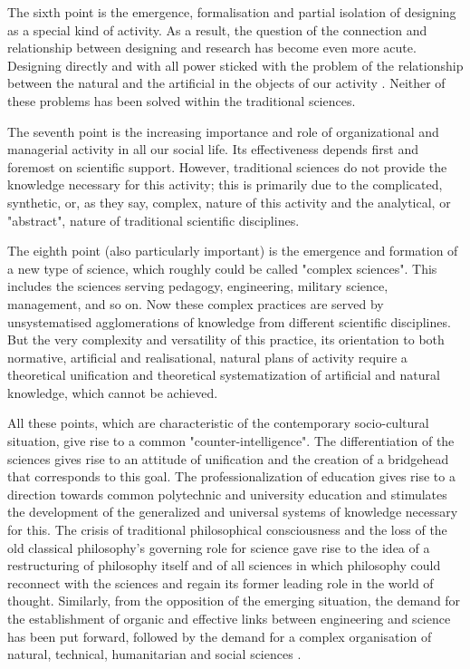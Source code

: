 \documentclass[11pt,a4paper]{article}
\begin{document}
The sixth point is the emergence, formalisation and partial isolation of
designing as a special kind of activity. As a result, the question of the
connection and relationship between designing and research has become even
more acute. Designing directly and with all power sticked with the problem of
the relationship between the natural and the artificial in the objects of our
activity \cite{Shchedrovitsky1967g, Simon1972}. Neither of these problems has
been solved within the traditional sciences.

The seventh point is the increasing importance and role of organizational and
managerial activity in all our social life. Its effectiveness depends first
and foremost on scientific support. However, traditional sciences do not
provide the knowledge necessary for this activity; this is primarily due to
the complicated, synthetic, or, as they say, complex, nature of this activity
and the analytical, or "abstract", nature of traditional scientific
disciplines.

The eighth point (also particularly important) is the emergence and formation
of a new type of science, which roughly could be called "complex sciences".
This includes the sciences serving pedagogy, engineering, military science,
management, and so on. Now these complex practices are served by
unsystematised agglomerations of knowledge from different scientific
disciplines. But the very complexity and versatility of this practice, its
orientation to both normative, artificial and realisational, natural plans of
activity require a theoretical unification and theoretical systematization of
artificial and natural knowledge, which cannot be achieved.

All these points, which are characteristic of the contemporary socio-cultural
situation, give rise to a common "counter-intelligence". The differentiation
of the sciences gives rise to an attitude of unification and the creation of a
bridgehead that corresponds to this goal. The professionalization of education
gives rise to a direction towards common polytechnic and university education
and stimulates the development of the generalized and universal systems of
knowledge necessary for this. The crisis of traditional philosophical
consciousness and the loss of the old classical philosophy's governing role
for science gave rise to the idea of a restructuring of philosophy itself and
of all sciences in which philosophy could reconnect with the sciences and
regain its former leading role in the world of thought. Similarly, from the
opposition of the emerging situation, the demand for the establishment of
organic and effective links between engineering and science has been put
forward, followed by the demand for a complex organisation of natural,
technical, humanitarian and social sciences \cite{Ackoff1972, Volkov1973,
  Development1975}.
\end{document}
